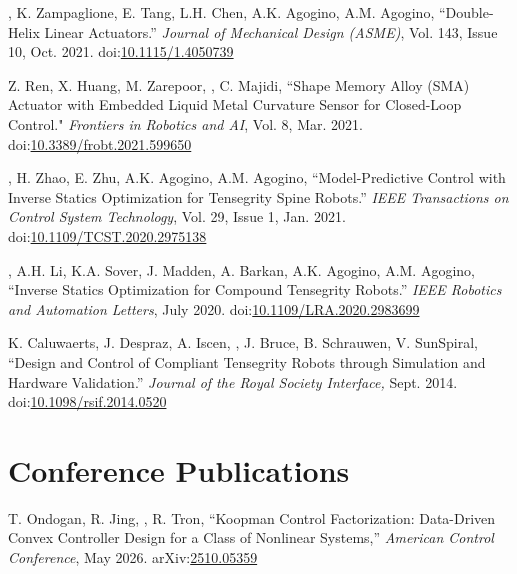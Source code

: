 \documentclass[letterpaper]{deedy-resume} %
\newcommand\doilink[1]{\href{http://dx.doi.org/#1}{#1}}
\newcommand\doi[1]{doi:\doilink{#1}}
\newcommand\arxivlink[1]{\href{https://arxiv.org/abs/#1}{#1}}
\newcommand\arxiv[1]{arXiv:\arxivlink{#1}}
\newcommand{\myname}{\underline{{\fontdescript{A.P. Sabelhaus}}}}
\begin{document}
{\begin{etaremune}[itemsep=0.1cm]
\item \underline{{}}, K. Zampaglione, E. Tang, L.H. Chen, A.K. Agogino, A.M. Agogino, ``Double-Helix Linear Actuators.'' {\it Journal of Mechanical Design (ASME)}, Vol. 143, Issue 10, Oct. 2021. \doi{10.1115/1.4050739}

\item Z. Ren, X. Huang, M. Zarepoor, \underline{{}}, C. Majidi, ``Shape Memory Alloy (SMA) Actuator with Embedded Liquid Metal Curvature Sensor for Closed-Loop Control." {\it Frontiers in Robotics and AI}, Vol. 8, Mar. 2021. \doi{10.3389/frobt.2021.599650}

\item \underline{{}}, H. Zhao, E. Zhu, A.K. Agogino, A.M. Agogino, ``Model-Predictive Control with Inverse Statics Optimization for Tensegrity Spine Robots.'' {\it IEEE Transactions on Control System Technology}, Vol. 29, Issue 1, Jan. 2021. \doi{10.1109/TCST.2020.2975138}

\item \underline{{}}, A.H. Li, K.A. Sover, J. Madden, A. Barkan, A.K. Agogino, A.M. Agogino, ``Inverse Statics Optimization for Compound Tensegrity Robots.'' {\it IEEE Robotics and Automation Letters}, July 2020. \doi{10.1109/LRA.2020.2983699}

\item K. Caluwaerts, J. Despraz, A. Iscen, \underline{{}}, J. Bruce, B. Schrauwen, V. SunSpiral, ``Design and Control of Compliant Tensegrity Robots through Simulation and Hardware Validation.'' {\it Journal of the Royal Society Interface,} Sept. 2014. \doi{10.1098/rsif.2014.0520}
\end{etaremune}


\section{Conference Publications}
\vspace{0.2cm}

\begin{etaremune}[itemsep=0.1cm]

\item T. Ondogan, R. Jing, \myname, R. Tron, ``Koopman Control Factorization: Data-Driven Convex Controller Design for a Class of Nonlinear Systems,'' {\it American Control Conference}, May 2026. \arxiv{2510.05359}


\end{etaremune}}
\end{document}
